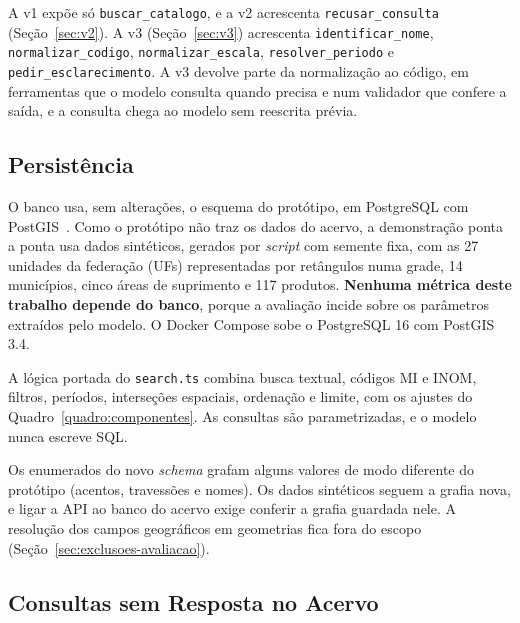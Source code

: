 \begin{sloppypar}
A v1 expõe só \texttt{buscar\_catalogo}, e a v2 acrescenta \texttt{recusar\_consulta} (Seção~\ref{sec:v2}). A v3 (Seção~\ref{sec:v3}) acrescenta \texttt{identificar\_\allowbreak nome}, \texttt{normalizar\_\allowbreak codigo}, \texttt{normalizar\_\allowbreak escala}, \texttt{resolver\_\allowbreak periodo} e \texttt{pedir\_\allowbreak esclarecimento}. A v3 devolve parte da normalização ao código, em ferramentas que o modelo consulta quando precisa e num validador que confere a saída, e a consulta chega ao modelo sem reescrita prévia.
\end{sloppypar}

\subsection{Persistência}
\label{sec:persistencia}

O banco usa, sem alterações, o esquema do protótipo, em PostgreSQL com PostGIS~\cite{postgis2001}. Como o protótipo não traz os dados do acervo, a demonstração ponta a ponta usa dados sintéticos, gerados por \textit{script} com semente fixa, com as 27 unidades da federação (UFs) representadas por retângulos numa grade, 14 municípios, cinco áreas de suprimento e 117 produtos. \textbf{Nenhuma métrica deste trabalho depende do banco}, porque a avaliação incide sobre os parâmetros extraídos pelo modelo. O Docker Compose sobe o PostgreSQL 16 com PostGIS 3.4.

A lógica portada do \texttt{search.ts} combina busca textual, códigos MI e INOM, filtros, períodos, interseções espaciais, ordenação e limite, com os ajustes do Quadro~\ref{quadro:componentes}. As consultas são parametrizadas, e o modelo nunca escreve SQL.

Os enumerados do novo \textit{schema} grafam alguns valores de modo diferente do protótipo (acentos, travessões e nomes). Os dados sintéticos seguem a grafia nova, e ligar a API ao banco do acervo exige conferir a grafia guardada nele. A resolução dos campos geográficos em geometrias fica fora do escopo (Seção~\ref{sec:exclusoes-avaliacao}).

\subsection{Consultas sem Resposta no Acervo}
\label{sec:sem-resposta}

